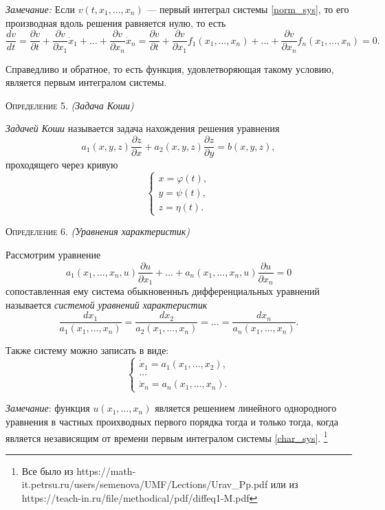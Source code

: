\textit{Замечание:} Если $ v(t, x_1, \dotsc, x_n) $ --- первый интеграл системы \eqref{norm_sys}, то его производная вдоль решения равняется нулю, то есть 
\begin{equation*}
	\frac{d v}{d t} = \frac{\partial v}{\partial t} + \frac{\partial v}{\partial x_1} \dot{x}_1 + \dotsc + \frac{\partial v}{\partial x_n} \dot{x}_n = \frac{\partial v}{\partial t} + \frac{\partial v}{\partial x_1} f_1(x_1, \dotsc, x_n) + \dotsc + \frac{\partial v}{\partial x_n} f_n(x_1, \dotsc, x_n) = 0.
\end{equation*}

Справедливо и обратное, то есть функция, удовлетворяющая такому условию, является первым интегралом системы.

\textsc{Определение 5.} \textit{(Задача Коши)}


\textit{Задачей Коши} называется задача нахождения решения уравнения 
\begin{equation*}
	a_1(x, y, z) \frac{\partial z}{\partial x} + a_2(x, y, z) \frac{\partial z}{\partial y} = b(x, y, z),
\end{equation*}
проходящего через кривую
\begin{equation*}
	\begin{cases}
		x = \varphi(t), \\
		y = \psi(t), \\
		z = \eta(t).
	\end{cases}
\end{equation*}

\textsc{Определение 6.}
\textit{(Уравнения характеристик)}


Рассмотрим уравнение
\begin{equation*}
	a_1(x_1, \dotsc, x_n, u) \frac{\partial u}{\partial x_1} + \dotsc + a_n(x_1, \dotsc, x_n, u) \frac{\partial u}{\partial x_n} = 0
\end{equation*}
сопоставленная ему система обыкновенныъ дифференциальных уравнений называется \textit{системой уравнений характеристик}
\begin{equation}
	\frac{d x_1}{a_1(x_1, \dotsc, x_n)} = \frac{d x_2}{a_2(x_1, \dotsc, x_n)} = \dotsc = \frac{d x_n}{a_n(x_1, \dotsc, x_n)}.
\end{equation}

Также систему можно записать в виде:
\begin{equation}  \label{char_sys}
	\begin{cases}
		\dot{x}_1 = a_1(x_1, \dotsc, x_2), \\
		\dotsc \\
		\dot{x}_n = a_n(x_1, \dotsc, x_n).
	\end{cases} \tag{5'}
\end{equation}

\textit{Замечание}: функция $ u(x_1, \dotsc, x_n) $ является решением линейного однородного уравнения в частных проихводных первого порядка тогда и только тогда, когда является независящим от времени первым интегралом системы \eqref{char_sys}. \footnote{Все было из https://math-it.petrsu.ru/users/semenova/UMF/Lections/Urav\_Pp.pdf 
	или из https://teach-in.ru/file/methodical/pdf/diffeq1-M.pdf
}